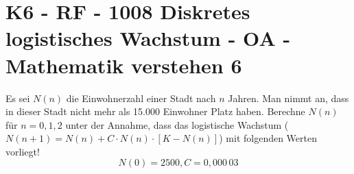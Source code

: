 \section{K6 - RF - 1008 Diskretes logistisches Wachstum - OA - Mathematik verstehen 6}

\begin{beispiel}[K6 - RF]{1} %
				Es sei $N(n)$ die Einwohnerzahl einer Stadt nach $n$ Jahren. Man nimmt an, dass in dieser Stadt nicht mehr als 15.000 Einwohner Platz haben. Berechne $N(n)$ für $n=0,1,2$ unter der Annahme, dass das logistische Wachstum \mbox{($N(n+1)=N(n)+C\cdot N(n)\cdot [K-N(n)]$)} mit folgenden Werten vorliegt!
						$$N(0)=2500, C=0,000\,03$$\leer
						
\end{beispiel}